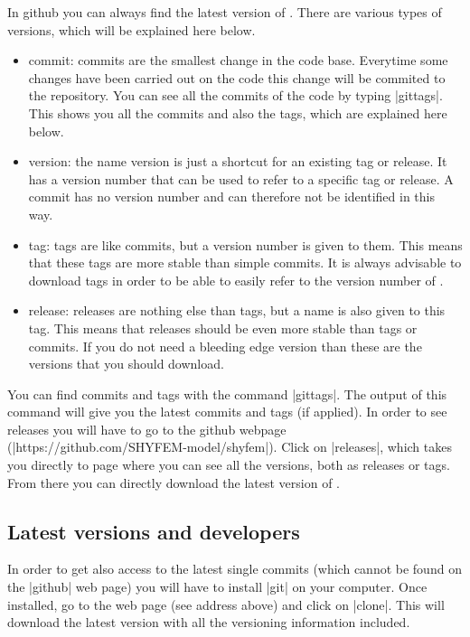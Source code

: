 In github you can always find the latest version of \shyfem{}. There
are various types of versions, which will be explained here below.

\begin{itemize}

\item commit: commits are the smallest change in the code base. Everytime
some changes have been carried out on the code this change will be
commited to the repository. You can see all the commits of the code
by typing |gittags|. This shows you all the commits and also the tags,
which are explained here below.

\item version: the name version is just a shortcut for an existing tag
or release. It has a version number that can be used to refer to a
specific tag or release. A commit has no version number and can therefore not
be identified in this way.

\item tag: tags are like commits, but a version number is given to
them. This means that these tags are more stable than simple commits. It
is always advisable to download tags in order to be able to easily refer
to the version number of \shyfem{}.

\item release: releases are nothing else than tags, but a name is also
given to this tag. This means that releases should be even more stable
than tags or commits. If you do not need a bleeding edge version than
these are the versions that you should download.

\end{itemize}

You can find commits and tags with the command |gittags|. The output of
this command will give you the latest commits and tags (if applied). In
order to see releases you will have to go to the github webpage
(|https://github.com/SHYFEM-model/shyfem|). Click on |releases|, which
takes you directly to page where you can see all the versions, both
as releases or tags. From there you can directly download the latest
version of \shyfem{}.

\subsection{Latest versions and developers}

In order to get also access to the latest single commits (which cannot
be found on the |github| web page) you will have to install |git| on
your computer. Once installed, go to the web page (see address above)
and click on |clone|. This will download the latest version with all
the versioning information included.

